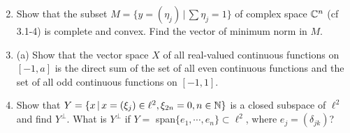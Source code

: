 \documentclass[10pt,a4paper]{report}
\begin{document}
\begin{enumerate}
	\setcounter{enumi}{1}
	\item Show that the subset $M = \{y =(\eta_j)\,|\, \sum \eta_j = 1\}$ of complex space $\mathbb{C}^n$ (cf 3.1-4) is complete and convex.  Find the vector of minimum norm in $M$.
	
	\item (a) Show that the vector space $X$ of all real-valued continuous functions on $[-1,a]$ is the direct sum of the set of all even continuous functions and the set of all odd continuous functions on $[-1,1]$.
	
	\setcounter{enumi}{5}
	\item Show that $Y=\{x\,|\, x=(\xi_j)\in \ell^2, \xi_{2n}=0, n\in \mathbb{N}\}$ is a closed subspace of $\ell^2$ and find $Y^\perp$.  What is $Y^\perp$ if $Y=$ span$\{e_1,\cdots,e_n\}\subset \ell^2$, where $e_j = (\delta_{jk})$?

\end{enumerate}
\end{document}
